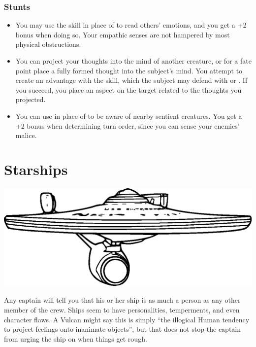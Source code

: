 \documentclass[12pt,titlepage,openany]{book}
\begin{document}
\subsection*{ Stunts}\label{subsec:betazoid-powers}
\begin{itemize}
    \item {} You may use the  skill in
        place of  to read others' emotions, and you get a +2
        bonus when doing so. Your empathic senses are not hampered by most
        physical obstructions.

    \item {} You can project your thoughts into the
        mind of another creature, or for a fate point place a fully formed
        thought into the subject's mind. You attempt to create an advantage
        with the  skill, which the subject may defend with
         or . If you succeed, you place an aspect
        on the target related to the thoughts you projected.

    \item {} You can use  in place of
         to be aware of nearby sentient creatures. You get a +2
        bonus when determining turn order, since you can sense your enemies'
        malice.
\end{itemize}



\chapter{Starships}\label{chap:starships}

\begin{center}
    \includegraphics[width=0.8\linewidth]{img/ConstitutionClass.eps}
\end{center}

\noindent
Any captain will tell you that his or her ship is as much a person as any other
member of the crew. Ships seem to have personalities, temperments, and even
character flaws. A Vulcan might say this is simply ``the illogical Human
tendency to project feelings onto inanimate objects'', but that does not stop
the captain from urging the ship on when things get rough.
\end{document}

